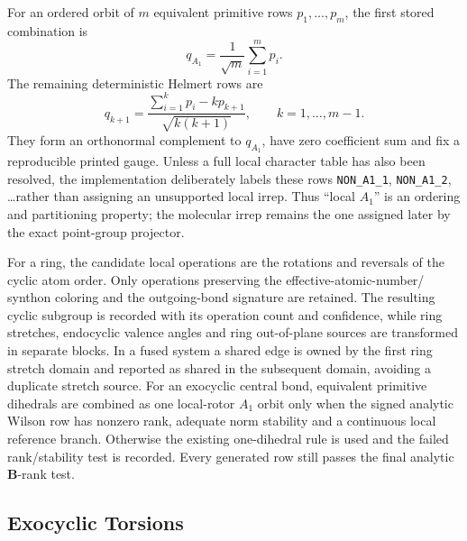 \documentclass[journal=jctcce,manuscript=article,layout=traditional]{achemso}
\newcommand{\Bmat}{\mathbf{B}}
\theoremstyle{definition}
\begin{document}
For an ordered orbit of \(m\) equivalent primitive rows
\(p_1,\ldots,p_m\), the first stored combination is
\begin{equation}
  q_{A_1}=\frac{1}{\sqrt{m}}\sum_{i=1}^{m}p_i .
\end{equation}
The remaining deterministic Helmert rows are
\begin{equation}
  q_{k+1}=\frac{\sum_{i=1}^{k}p_i-kp_{k+1}}{\sqrt{k(k+1)}},
  \qquad k=1,\ldots,m-1.
  \label{eq:local-helmert-salc}
\end{equation}
They form an orthonormal complement to \(q_{A_1}\), have zero coefficient sum
and fix a reproducible printed gauge.  Unless a full local character table has
also been resolved, the implementation deliberately labels these rows
\texttt{NON\_A1\_1}, \texttt{NON\_A1\_2}, \ldots rather than assigning an
unsupported local irrep.  Thus ``local \(A_1\)'' is an ordering and partitioning
property; the molecular irrep remains the one assigned later by the exact
point-group projector.

For a ring, the candidate local operations are the rotations and reversals of
the cyclic atom order.  Only operations preserving the effective-atomic-number/
synthon coloring and the outgoing-bond signature are retained.  The resulting
cyclic subgroup is recorded with its operation count and confidence, while
ring stretches, endocyclic valence angles and ring out-of-plane sources are transformed in
separate blocks.  In a fused system a shared edge is owned by the first ring
stretch domain and reported as shared in the subsequent domain, avoiding a
duplicate stretch source.  For an exocyclic central bond, equivalent primitive
dihedrals are combined as one local-rotor \(A_1\) orbit only when the signed
analytic Wilson row has nonzero rank, adequate norm stability and a continuous
local reference branch.  Otherwise the existing one-dihedral rule is used and
the failed rank/stability test is recorded.  Every generated row still passes the final analytic
\(\Bmat\)-rank test.

\subsection{Exocyclic Torsions}
\end{document}

